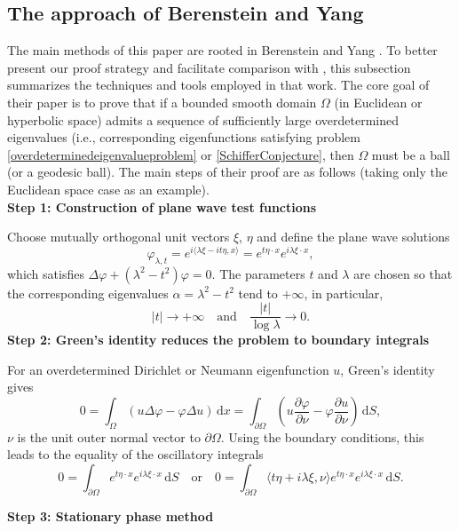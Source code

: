 \documentclass[12pt]{article}
\numberwithin{equation}{section}
\numberwithin{equation}{section}
\begin{document}
\subsection{The approach of Berenstein and Yang \cite{Berenstein2}}

The main methods of this paper are rooted in Berenstein and Yang \cite{Berenstein2}. To better present our proof strategy and facilitate comparison with \cite{Berenstein2}, this subsection summarizes the techniques and tools employed in that work. The core goal of their paper \cite{Berenstein2} is to prove that if a bounded smooth domain $\Omega$ (in Euclidean or hyperbolic space) admits a sequence of sufficiently large overdetermined eigenvalues (i.e., corresponding eigenfunctions satisfying problem \eqref{overdeterminedeigenvalueproblem} or \eqref{SchifferConjecture}, then $\Omega$ must be a ball (or a geodesic ball). The main steps of their proof are as follows (taking only the Euclidean space case as an example).
~\\

\textbf{Step 1: Construction of plane wave test functions}

Choose mutually orthogonal unit vectors $\xi$, $\eta$ and define the plane wave solutions
$$
\varphi_{\lambda,t}=e^{i\langle\lambda \xi-i t \eta, x\rangle}=e^{t\eta\cdot x}e^{i\lambda\xi\cdot x},
$$
which satisfies $\Delta\varphi+\left(\lambda^2-t^2\right)\varphi=0$. The parameters $t$ and $\lambda$ are chosen so that the corresponding eigenvalues $\alpha= \lambda^2 - t^2$ tend to $+\infty$, in particular,
$$
|t|\rightarrow+\infty  \quad \text{and} \quad \frac{|t|}{\log\lambda}\rightarrow 0.
$$
\indent
\textbf{Step 2: Green's identity reduces the problem to boundary integrals}

For an overdetermined Dirichlet or Neumann eigenfunction $u$, Green's identity gives
$$
0=\int_{\Omega}\left(u\Delta\varphi-\varphi\Delta u\right)\,\text{d}x=\int_{\partial\Omega}\left(u\frac{\partial\varphi}{\partial\nu}-\varphi\frac{\partial u}{\partial\nu}\right)\,\text{d}S,
$$
$\nu$ is the unit outer normal vector to $\partial \Omega$.
Using the boundary conditions, this leads to the equality of the oscillatory integrals
$$
0=\int_{\partial\Omega}e^{t\eta\cdot x}e^{i\lambda\xi\cdot x}\,\text{d}S \quad \text{or} \quad 0=\int_{\partial\Omega}\langle t \eta+i\lambda \xi, \nu\rangle e^{t\eta\cdot x}e^{i\lambda\xi\cdot x}\,\text{d}S.
$$

\textbf{Step 3: Stationary phase method}
\end{document}
